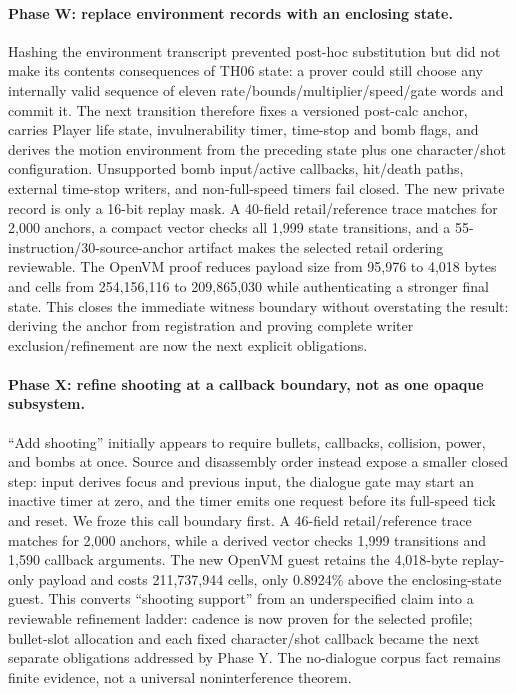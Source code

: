 \paragraph{Phase W: replace environment records with an enclosing state.}
Hashing the environment transcript prevented post-hoc substitution but did not
make its contents consequences of TH06 state: a prover could still choose any
internally valid sequence of eleven rate/bounds/multiplier/speed/gate words and
commit it.  The next transition therefore fixes a versioned post-calc anchor,
carries Player life state, invulnerability timer, time-stop and bomb flags, and
derives the motion environment from the preceding state plus one character/shot
configuration.  Unsupported bomb input/active callbacks, hit/death paths,
external time-stop writers, and non-full-speed timers fail closed.  The new
private record is only a 16-bit replay mask.  A 40-field retail/reference trace
matches for 2,000 anchors, a compact vector checks all 1,999 state transitions,
and a 55-instruction/30-source-anchor artifact makes the selected retail
ordering reviewable.  The OpenVM proof reduces payload size from 95,976 to
4,018 bytes and cells from 254,156,116 to 209,865,030 while authenticating a
stronger final state.  This closes the immediate witness boundary without
overstating the result: deriving the anchor from registration and proving
complete writer exclusion/refinement are now the next explicit obligations.

\paragraph{Phase X: refine shooting at a callback boundary, not as one opaque
subsystem.}
``Add shooting'' initially appears to require bullets, callbacks, collision,
power, and bombs at once.  Source and disassembly order instead expose a
smaller closed step: input derives focus and previous input, the dialogue gate
may start an inactive timer at zero, and the timer emits one
 request before its full-speed tick and reset.
We froze this call boundary first.  A 46-field retail/reference trace matches
for 2,000 anchors, while a derived vector checks 1,999 transitions and 1,590
callback arguments.  The new OpenVM guest retains the 4,018-byte replay-only
payload and costs 211,737,944 cells, only 0.8924\% above the enclosing-state
guest.  This converts ``shooting support'' from an underspecified claim into a
reviewable refinement ladder: cadence is now proven for the selected profile;
bullet-slot allocation and each fixed character/shot callback became the next
separate obligations addressed by Phase Y.  The no-dialogue corpus fact
remains finite evidence,
not a universal noninterference theorem.

